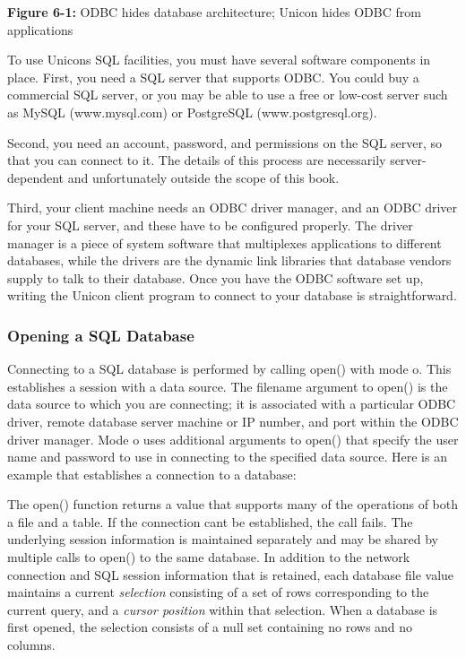 {\sffamily\bfseries Figure 6-1:}
{\sffamily ODBC hides database architecture; Unicon hides ODBC from
 applications}

\bigskip

To use Unicon{\textquotesingle}s SQL facilities, you must have several
software components in place. First, you need a SQL server that
supports ODBC. You could buy a commercial SQL server, or you may be
able to use a free or low-cost server such as MySQL
(\textsf{www.mysql.com}) or PostgreSQL
(\textsf{www.postgresql.org}).

Second, you need an account, password, and permissions on the SQL
server, so that you can connect to it. The details of this process are
necessarily server-dependent and unfortunately outside the scope of
this book.

Third, your client machine needs an ODBC
driver manager, and an ODBC driver for your SQL server, and these have
to be configured properly. The driver manager is a piece of system
software that multiplexes applications to different databases, while
the drivers are the dynamic link libraries that database vendors supply
to talk to their database. Once you have the ODBC software set up,
writing the Unicon client program to connect to your database is
straightforward.

\subsubsection[Opening a SQL Database]{Opening a SQL Database}
Connecting to a SQL database is performed by calling \textsf{open()}
with mode \textsf{{\textquotedbl}o{\textquotedbl}}. This establishes a
session with a data source. The filename argument to \textsf{open()} is
the data source to which you are connecting; it is associated with a
particular ODBC driver, remote database server machine or IP number,
and port within the ODBC driver manager. Mode
\textsf{{\textquotedbl}o{\textquotedbl}} uses additional arguments to
\textsf{open()} that specify the user name and password to use in
connecting to the specified data source. Here is an example that
establishes a connection to a database:


The \textsf{open()} function returns a value that supports many of the
operations of both a file and a table. If the connection
can{\textquotesingle}t be established, the call fails. The underlying
session information is maintained separately and may be shared by
multiple calls to \textsf{open()} to the same database. In addition to
the network connection and SQL session information that is retained,
each database file value maintains a current \textit{selection}
consisting of a set of rows corresponding to the current query, and a
\textit{cursor position} within that selection. When a database is
first opened, the selection consists of a null set containing no rows
and no columns.


